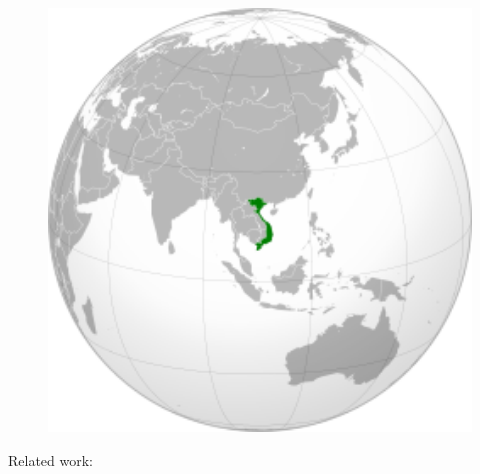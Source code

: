 \documentclass[aspectratio=169]{beamer}
\begin{document}
\begin{frame}[fragile]
\begin{minipage}{.30\textwidth}
\begin{figure}
        \includegraphics[width=1.0\textwidth]{images/Vietnam-Wikipedia-Position.png} 
    \end{figure}
    \end{minipage}

    \vspace{0.6cm}
    \begin{minipage}{1.0\textwidth}
    \centering
    \footnotesize
    Related work: \citep{tran2022MethodChineseVietnameseBilingual, le2023ParallelCorpusVietnamese, li2020RevisitingBackTranslationLowResource, vu2020KoreanVietnameseNeuralMachine, doan2021PhoMTHighQualityLargeScale}
    \end{minipage}
\end{frame}
\end{document}
